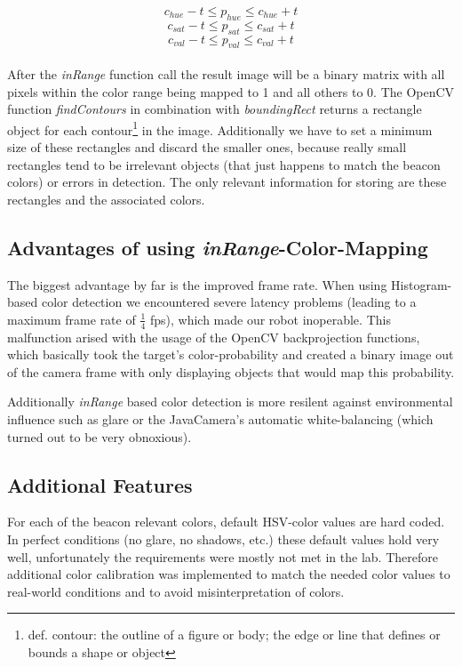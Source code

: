 \documentclass[703031]{iisreport}
\begin{document}
\[c_{hue} - t \le p_{hue} \le c_{hue} + t\]
\[c_{sat} - t \le p_{sat} \le c_{sat} + t\]
\[c_{val} - t \le p_{val} \le c_{val} + t\]\\
After the \emph{inRange} function call\cite{opencv_man_arrays} the result image will be a binary matrix with all pixels within the color range being mapped to 1 and all others to 0. The OpenCV function \emph{findContours}\cite{opencv_man_struct_analysis} in combination with \emph{boundingRect}\cite{opencv_man_struct_analysis} returns a rectangle object for each contour\footnote{def. contour: the outline of a figure or body; the edge or line that defines or bounds a shape or object\cite{dict_contour}} in the image. Additionally we have to set a minimum size of these rectangles and discard the smaller ones, because really small rectangles tend to be irrelevant objects (that just happens to match the beacon colors) or errors in detection.
The only relevant information for storing are these rectangles and the associated colors. 

\subsection{Advantages of using \emph{inRange}-Color-Mapping}
The biggest advantage by far is the improved frame rate. When using Histogram-based color detection we encountered severe latency problems (leading to a maximum frame rate of $\frac{1}{4}$ fps), which made our robot inoperable. This malfunction arised with the usage of the OpenCV backprojection functions, which basically took the target's color-probability and created a binary image out of the camera frame with only displaying objects that would map this probability.

Additionally \emph{inRange} based color detection is more resilent against environmental influence such as glare or the JavaCamera's automatic white-balancing (which turned out to be very obnoxious).

\subsection{Additional Features}
For each of the beacon relevant colors, default HSV-color values are hard coded. In perfect conditions (no glare, no shadows, etc.) these default values hold very well, unfortunately the requirements were mostly not met in the lab. Therefore additional color calibration was implemented to match the needed color values to real-world conditions and to avoid misinterpretation of colors.
\end{document}
